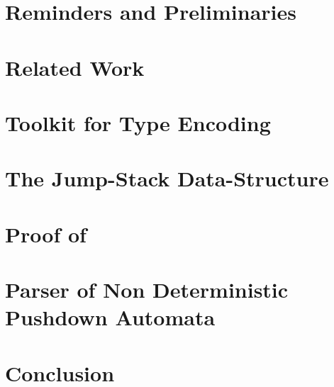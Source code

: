 \documentclass[a4paper,USenglish]{lipics}
\begin{document}
\section{Reminders and Preliminaries}
\label{Section:preliminaries}


\section{Related Work}
\label{Section:related}


\section{Toolkit for Type Encoding}
\label{Section:toolkit}


\section{The Jump-Stack Data-Structure}
\label{Section:jump}


\section{Proof of }
\label{Section:proof}


\section{Parser of Non Deterministic Pushdown Automata}
\label{Section:bridge}


\section{Conclusion}
\label{Section:zz}


\small

\end{document}
